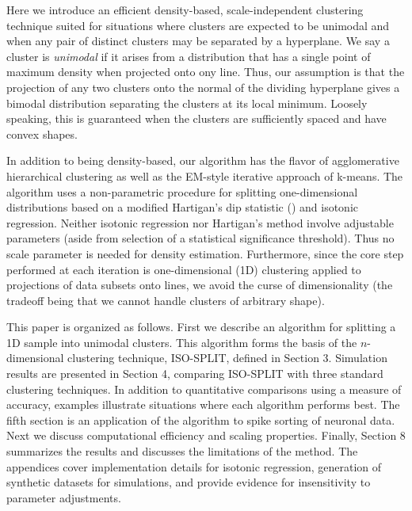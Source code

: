 \documentclass[10pt]{article}
\begin{document}
Here we introduce an efficient density-based, scale-independent clustering technique suited for situations where clusters are expected to be unimodal and when any pair of distinct clusters may be separated by a hyperplane. We say a cluster is {\em unimodal} if it arises from a distribution that has a single point of maximum density when projected onto ony line. Thus, our assumption is that the projection of any two clusters onto the normal of the dividing hyperplane gives a bimodal distribution separating the clusters at its local minimum. Loosely speaking, this is guaranteed when the clusters are sufficiently spaced and have convex shapes.

In addition to being density-based, our algorithm has the flavor of agglomerative hierarchical clustering as well as the EM-style iterative approach of k-means. The algorithm uses a non-parametric procedure for splitting one-dimensional distributions based on a modified Hartigan's dip statistic (\cite{hartigan1985dip}) and isotonic regression. Neither isotonic regression nor Hartigan's method involve adjustable parameters (aside from selection of a statistical significance threshold). Thus no scale parameter is needed for density estimation. Furthermore, since the core step performed at each iteration is one-dimensional (1D) clustering applied to projections of data subsets onto lines, we avoid the curse of dimensionality (the tradeoff being that we cannot handle clusters of arbitrary shape).

This paper is organized as follows. First we describe an algorithm for splitting a 1D sample into unimodal clusters. This algorithm forms the basis of the $n$-dimensional clustering technique, ISO-SPLIT, defined in Section 3. Simulation results are presented in Section 4, comparing ISO-SPLIT with three standard clustering techniques. In addition to quantitative comparisons using a measure of accuracy, examples illustrate situations where each algorithm performs best. The fifth section is an application of the algorithm to spike sorting of neuronal data. Next we discuss computational efficiency and scaling properties. Finally, Section 8 summarizes the results and discusses the limitations of the method. The appendices cover implementation details for isotonic regression, generation of synthetic datasets for simulations, and provide evidence for insensitivity to parameter adjustments.
\end{document}

